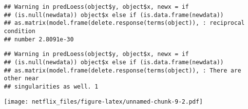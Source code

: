 \documentclass[
]{article}
\begin{document}
\begin{verbatim}
## Warning in predLoess(object$y, object$x, newx = if
## (is.null(newdata)) object$x else if (is.data.frame(newdata))
## as.matrix(model.frame(delete.response(terms(object)), : reciprocal condition
## number 2.8091e-30
\end{verbatim}

\begin{verbatim}
## Warning in predLoess(object$y, object$x, newx = if
## (is.null(newdata)) object$x else if (is.data.frame(newdata))
## as.matrix(model.frame(delete.response(terms(object)), : There are other near
## singularities as well. 1
\end{verbatim}

\texttt{[image: netflix\_files/figure-latex/unnamed-chunk-9-2.pdf]}
\end{document}
